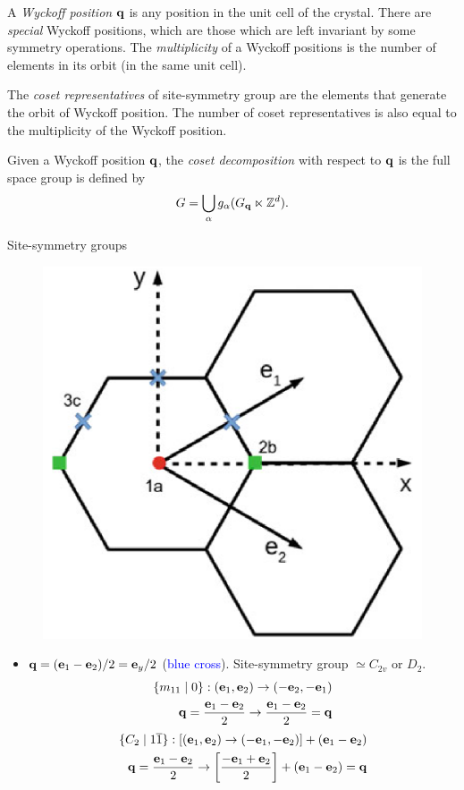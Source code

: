 \documentclass[10pt,aspectratio=169,xcolor={table,dvipsnames}]{beamer}
\begin{document}
\begin{frame}
\begin{definition}
A \textit{Wyckoff position} ${\vb{q}}$ is any position in the unit cell of the crystal. There are \textit{special} Wyckoff positions, which are those which are left invariant by some symmetry operations. The \textit{multiplicity} of a Wyckoff positions is the number of elements in its orbit (in the same unit cell).
\end{definition}

\begin{definition}
The \textit{coset representatives} of site-symmetry group are the elements that generate the orbit of Wyckoff position. The number of coset representatives is also equal to the multiplicity of the Wyckoff position.
\end{definition}

\begin{definition}
Given a Wyckoff position ${\vb{q}}$, the \textit{coset decomposition} with respect to ${\vb{q}}$ is the full space group is defined by
$$
G = \bigcup_\alpha g_\alpha (G_{{\vb{q}}} \ltimes \mathbb{Z}^d).
$$
\end{definition}
\end{frame}

\begin{frame}{Site-symmetry groups}
\begin{figure}[H]
\centering
\includegraphics[width=0.22\linewidth]{fig/wyckoff_pos.png}
\end{figure}
\begin{itemize}
\item ${\vb{q}} = ({\vb{e}}_1 - {\vb{e}}_2) / 2 = {\vb{e}}_y / 2$ (\textcolor{blue}{blue cross}). Site-symmetry group $\simeq C_{2v}$ or $D_2$.
\begin{align*}
\{m_{11} \mid 0\}: ({\vb{e}}_1, {\vb{e}}_2) \to (-{\vb{e}}_2, -{\vb{e}}_1)
\\
{\vb{q}} = \frac{{\vb{e}}_1-{\vb{e}}_2}{2} \to \frac{{\vb{e}}_1-{\vb{e}}_2}{2} = {\vb{q}}
\end{align*}
\begin{align*}
\{C_2 \mid 1\overline{1}\}: [({\vb{e}}_1, {\vb{e}}_2) \to (-{\vb{e}}_1, -{\vb{e}}_2)] + ({\vb{e}}_1 - {\vb{e}}_2)
\\
{\vb{q}} = \frac{{\vb{e}}_1-{\vb{e}}_2}{2} \to \qty[\frac{-{\vb{e}}_1+{\vb{e}}_2}{2}] + ({\vb{e}}_1 - {\vb{e}}_2) = {\vb{q}}
\end{align*}
\end{itemize}
\end{frame}
\end{document}
